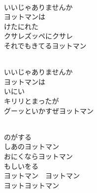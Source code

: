 \documentclass[10pt,b5j]{tarticle} %
\begin{document}
\begin{enumerate}
\begin{minipage}[c]{\blocksize}
        \vspace{\linespace}
        \item~\\
        いいじゃありませんか\\
        ヨットマンは\\
        けたにれた\\
        クサレズッペにクサレ\\
        それでもきてるヨットマン
        
    \end{minipage}
    \begin{minipage}[c]{\blocksize}
        
        \vspace{\linespace}
        \item~\\
        いいじゃありませんか\\
        ヨットマンは\\
        いにい\\
        キリリとまったが\\
        グーッといかすぜヨットマン
        
        \vspace{\linespace}
        \item~\\
        のがする\\
        しあのヨットマン\\
        おにくならヨットマン\\
        もしいをる\\
        ヨットマン~~ヨットマン\\
        ヨットヨットマン
    
    \end{minipage}
\end{enumerate} %
\end{document}
